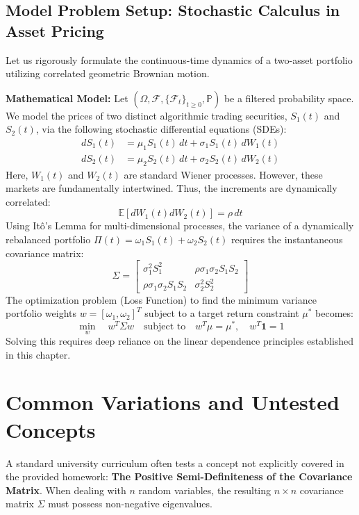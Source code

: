 \documentclass[11pt, a4paper]{article}
\theoremstyle{definition}
\theoremstyle{remark}
\newcommand{\E}{\mathbb{E}}
\newcommand{\Prob}{\mathbb{P}}
\newcommand{\F}{\mathcal{F}}
\begin{document}
\subsection{Model Problem Setup: Stochastic Calculus in Asset Pricing}
Let us rigorously formulate the continuous-time dynamics of a two-asset portfolio utilizing correlated geometric Brownian motion.

\textbf{Mathematical Model:} Let $(\Omega, \F, \{\F_t\}_{t \ge 0}, \Prob)$ be a filtered probability space. We model the prices of two distinct algorithmic trading securities, $S_1(t)$ and $S_2(t)$, via the following stochastic differential equations (SDEs):
\begin{align*}
dS_1(t) &= \mu_1 S_1(t) \,dt + \sigma_1 S_1(t) \,dW_1(t) \\
dS_2(t) &= \mu_2 S_2(t) \,dt + \sigma_2 S_2(t) \,dW_2(t)
\end{align*}
Here, $W_1(t)$ and $W_2(t)$ are standard Wiener processes. However, these markets are fundamentally intertwined. Thus, the increments are dynamically correlated:
\[
\E[dW_1(t) dW_2(t)] = \rho \,dt
\]
Using It\^{o}'s Lemma for multi-dimensional processes, the variance of a dynamically rebalanced portfolio $\Pi(t) = \omega_1 S_1(t) + \omega_2 S_2(t)$ requires the instantaneous covariance matrix:
\[
\Sigma = \begin{bmatrix}
\sigma_1^2 S_1^2 & \rho \sigma_1 \sigma_2 S_1 S_2 \\
\rho \sigma_1 \sigma_2 S_1 S_2 & \sigma_2^2 S_2^2
\end{bmatrix}
\]
The optimization problem (Loss Function) to find the minimum variance portfolio weights $w = [\omega_1, \omega_2]^T$ subject to a target return constraint $\mu^*$ becomes:
\[
\min_{w} \quad w^T \Sigma w \quad \text{subject to} \quad w^T \mu = \mu^*, \quad w^T \mathbf{1} = 1
\]
Solving this requires deep reliance on the linear dependence principles established in this chapter.

\newpage
\section{Common Variations and Untested Concepts}

A standard university curriculum often tests a concept not explicitly covered in the provided homework: \textbf{The Positive Semi-Definiteness of the Covariance Matrix}. When dealing with $n$ random variables, the resulting $n \times n$ covariance matrix $\Sigma$ must possess non-negative eigenvalues.
\end{document}
